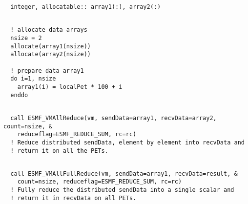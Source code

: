  \begin{verbatim}
  integer, allocatable:: array1(:), array2(:)
 
\end{verbatim}
 

 \begin{verbatim}
  ! allocate data arrays
  nsize = 2
  allocate(array1(nsize))
  allocate(array2(nsize))

  ! prepare data array1
  do i=1, nsize
    array1(i) = localPet * 100 + i
  enddo
 
\end{verbatim}
 

 \begin{verbatim}
  call ESMF_VMAllReduce(vm, sendData=array1, recvData=array2, count=nsize, &
    reduceflag=ESMF_REDUCE_SUM, rc=rc)
  ! Reduce distributed sendData, element by element into recvData and
  ! return it on all the PETs.
 
\end{verbatim}
 

 \begin{verbatim}
  call ESMF_VMAllFullReduce(vm, sendData=array1, recvData=result, &
    count=nsize, reduceflag=ESMF_REDUCE_SUM, rc=rc)
  ! Fully reduce the distributed sendData into a single scalar and
  ! return it in recvData on all PETs.
 
\end{verbatim}

\setlength{\parskip}{\oldparskip}
\setlength{\parindent}{\oldparindent}
\setlength{\baselineskip}{\oldbaselineskip}
